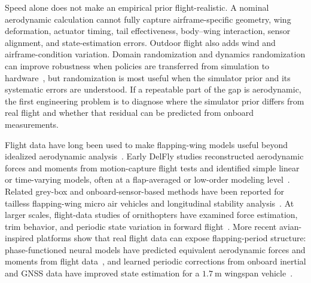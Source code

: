 Speed alone does not make an empirical prior flight-realistic. A nominal aerodynamic calculation cannot fully capture airframe-specific geometry, wing deformation, actuator timing, tail effectiveness, body--wing interaction, sensor alignment, and state-estimation errors. Outdoor flight also adds wind and airframe-condition variation. Domain randomization and dynamics randomization can improve robustness when policies are transferred from simulation to hardware~\cite{tobin2017domainrandomization,peng2018dynamicsrandomization,muratore2022randomized_simulations}, but randomization is most useful when the simulator prior and its systematic errors are understood. If a repeatable part of the gap is aerodynamic, the first engineering problem is to diagnose where the simulator prior differs from real flight and whether that residual can be predicted from onboard measurements.

Flight data have long been used to make flapping-wing models useful beyond idealized aerodynamic analysis~\cite{khan2021fwmav_systemid_review}. Early DelFly studies reconstructed aerodynamic forces and moments from motion-capture flight tests and identified simple linear or time-varying models, often at a flap-averaged or low-order modeling level~\cite{caetano_linear_2013,armanini_time-varying_2016}. Related grey-box and onboard-sensor-based methods have been reported for tailless flapping-wing micro air vehicles and longitudinal stability analysis~\cite{nijboer_longitudinal_2020,aurecianus_longitudinal_2022}. At larger scales, flight-data studies of ornithopters have examined force estimation, trim behavior, and periodic state variation in forward flight~\cite{aminietal2020largescale}. More recent avian-inspired platforms show that real flight data can expose flapping-period structure: phase-functioned neural models have predicted equivalent aerodynamic forces and moments from flight data~\cite{zhao2025phase}, and learned periodic corrections from onboard inertial and GNSS data have improved state estimation for a $1.7~\mathrm{m}$ wingspan vehicle~\cite{qian_learning_2026}.

